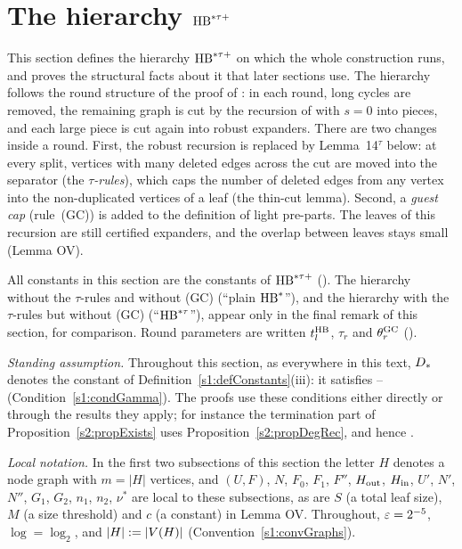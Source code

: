 \section{The hierarchy \texorpdfstring{$\mathrm{HB}^{*\tau{+}}$}{HB*tau+}}\label{s2:sec}

This section defines the hierarchy $\mathrm{HB}^{*\tau{+}}$ on which the whole construction
runs, and proves the structural facts about it that later sections use. The
hierarchy follows the round structure of the proof of \cite[Theorem~2]{BM}:
in each round, long cycles are removed, the remaining graph is cut by the
recursion of \cite[Lemma~14]{BM} with $s=0$ into pieces, and each large piece
is cut again into robust expanders. There are two changes inside a round.
First, the robust recursion is replaced by Lemma~14$^\tau$ below: at every
split, vertices with many deleted edges across the cut are moved into the
separator (the \emph{$\tau$-rules}), which caps the number of deleted edges
from any vertex into the non-duplicated vertices of a leaf (the thin-cut
lemma). Second, a \emph{guest cap}
(rule~(GC)) is added to the definition of light pre-parts. The leaves of this
recursion are still certified expanders, and the overlap between leaves stays
small (Lemma OV).

All constants in this section are the constants of $\mathrm{HB}^{*\tau{+}}$ (). The
hierarchy without the $\tau$-rules and without (GC) (``plain $\mathrm{HB}^{*}$''), and the
hierarchy with the $\tau$-rules but without (GC) (``$\mathrm{HB}^{*\tau}$''), appear only in
the final remark of this section, for comparison. Round parameters are written
$t^{\mathrm{HB}}_l$, $\tau_r$ and $\theta^{\mathrm{GC}}_r$ ().

\emph{Standing assumption.} Throughout this section, as everywhere in this
text, $D_{*}$ denotes the constant of Definition~\ref{s1:defConstants}(iii):
it satisfies -- (Condition~\ref{s1:condGamma}). The proofs use
these conditions either directly or through the results they apply; for
instance the termination part of Proposition~\ref{s2:propExists} uses
Proposition~\ref{s2:propDegRec}, and hence .

\emph{Local notation.} In the first two subsections of this section the
letter $H$ denotes a node graph with $m=|H|$ vertices, and $(U,F)$, $N$,
$F_0$, $F_1$, $F''$, $H_{\mathrm{out}}$, $H_{\mathrm{in}}$, $U'$, $N'$, $N''$, $G_1$, $G_2$, $n_1$,
$n_2$, $\nu^*$ are local to these subsections, as are $S$ (a total leaf
size), $M$ (a size threshold) and $c$ (a constant) in
Lemma OV. Throughout, $\varepsilon=2^{-5}$, $\log=\log_2$, and
$|H|\mathrel{:=}|V(H)|$ (Convention~\ref{s1:convGraphs}).

